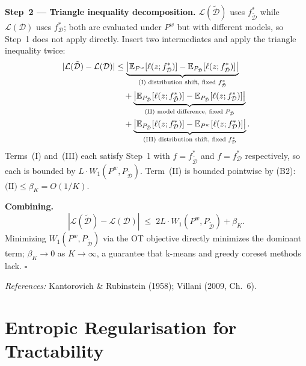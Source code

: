 \documentclass[runningheads]{llncs}
\begin{document}
\textbf{Step~2 --- Triangle inequality decomposition.}
$\mathcal{L}(\tilde{\mathcal{D}})$ uses $f^*_{\tilde{\mathcal{D}}}$ while $\mathcal{L}(\mathcal{D})$ uses $f^*_\mathcal{D}$; both are evaluated under $P^w$ but with different models, so Step~1 does not apply directly.
Insert two intermediates and apply the triangle inequality twice:
\begin{align}
    |\mathcal{L}(\tilde{\mathcal{D}}) - \mathcal{L}(\mathcal{D})|
    &\leq
    \underbrace{
        \left|
            \mathbb{E}_{P^w}[\ell(z;f^*_{\tilde{\mathcal{D}}})]
            - \mathbb{E}_{P_{\tilde{\mathcal{D}}}}[\ell(z;f^*_{\tilde{\mathcal{D}}})]
        \right|
    }_{\text{(I) distribution shift, fixed }f^*_{\tilde{\mathcal{D}}}} \notag \\
    &\quad +
    \underbrace{
        \left|
            \mathbb{E}_{P_{\tilde{\mathcal{D}}}}[\ell(z;f^*_{\tilde{\mathcal{D}}})]
            - \mathbb{E}_{P_{\tilde{\mathcal{D}}}}[\ell(z;f^*_\mathcal{D})]
        \right|
    }_{\text{(II) model difference, fixed }P_{\tilde{\mathcal{D}}}} \notag \\
    &\quad +
    \underbrace{
        \left|
            \mathbb{E}_{P_{\tilde{\mathcal{D}}}}[\ell(z;f^*_\mathcal{D})]
            - \mathbb{E}_{P^w}[\ell(z;f^*_\mathcal{D})]
        \right|
    }_{\text{(III) distribution shift, fixed }f^*_\mathcal{D}}.
\end{align}
Terms~(I) and~(III) each satisfy Step~1 with $f = f^*_{\tilde{\mathcal{D}}}$ and $f = f^*_\mathcal{D}$ respectively, so each is bounded by $L \cdot W_1(P^w, P_{\tilde{\mathcal{D}}})$.
Term~(II) is bounded pointwise by (B2): $\text{(II)} \leq \beta_K = O(1/K)$.

\textbf{Combining.}
\begin{equation}
    |\mathcal{L}(\tilde{\mathcal{D}}) - \mathcal{L}(\mathcal{D})|
    \;\leq\; 2L \cdot W_1(P^w, P_{\tilde{\mathcal{D}}}) + \beta_K.
\end{equation}
Minimizing $W_1(P^w, P_{\tilde{\mathcal{D}}})$ via the OT objective directly minimizes the dominant term; $\beta_K \to 0$ as $K \to \infty$, a guarantee that k-means and greedy coreset methods lack. $\square$

\noindent\textit{References:} Kantorovich \& Rubinstein (1958); Villani (2009, Ch.~6).


\section{Entropic Regularisation for Tractability}
\label{app:method}
\end{document}
